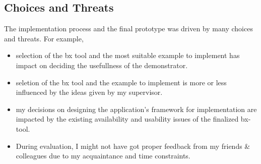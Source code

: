 \subsection{Choices and Threats}\label{subsec:design_choicesthreats}
The implementation process and the final prototype was driven by many choices and threats. For example, 
\begin{itemize} 
	\item {selection of the bx tool and the most suitable example to implement has impact on deciding the usefullness of the demonstrator.}
	\item {seletion of the bx tool and the example to implement is more or less influenced by the ideas given by my supervisor.} 
	\item {my decisions on designing the application's framework for implementation are impacted by the existing availability and usability issues of the finalized bx-tool.}
	\item {During evaluation, I might not have got proper feedback from my friends \& colleagues due to my acquaintance and time constraints.}
\end{itemize}
